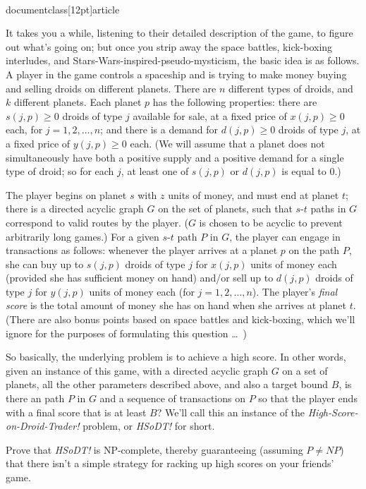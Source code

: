 \\documentclass[12pt]{article}
\begin{document}
\begin{enumerate}
It takes you a while, listening to their detailed description
of the game, to figure out what's going on;
but once you strip away the space battles, kick-boxing interludes,
and Stars-Wars-inspired-pseudo-mysticism,
the basic idea is as follows.
A player in the game controls a spaceship and
is trying to make money buying and selling droids on different planets.
There are $n$ different types of droids,
and $k$ different planets.
Each planet $p$ has the following properties:
there are $s(j,p) \geq 0$ droids of type $j$ available for sale,
at a fixed price of $x(j,p) \geq 0$ each, for $j = 1, 2, \ldots, n$;
and there is a demand for $d(j,p) \geq 0$ droids of type $j$,
at a fixed price of $y(j,p) \geq 0$ each.
(We will assume that a planet does not simultaneously
have both a positive supply and a positive demand for a single type of droid;
so for each $j$, at least one of $s(j,p)$ or $d(j,p)$ is equal to $0$.)

The player begins on planet $s$ with $z$ units of money,
and must end at planet $t$;
there is a directed acyclic graph $G$ on the set of planets,
such that $s$-$t$ paths in $G$ correspond to
valid routes by the player.
($G$ is chosen to be acyclic to prevent arbitrarily long games.)
For a given $s$-$t$ path $P$ in $G$, the player can engage
in transactions as follows:
whenever the player arrives at a planet $p$ on the path $P$,
she can buy up to $s(j,p)$ droids of type $j$ for $x(j,p)$ units of money each
(provided she has sufficient money on hand)
and/or sell up to $d(j,p)$ droids of type $j$ for $y(j,p)$ units of money each
(for $j = 1, 2, \ldots, n$).
The player's {\em final score} is the total amount of
money she has on hand when she arrives at planet $t$.
(There are also bonus points based on space battles and kick-boxing,
which we'll ignore for the purposes of formulating this question \ldots\ )

So basically, the underlying problem is to achieve a high score.
In other words, given an instance of this game,
with a directed acyclic graph $G$ on a set of planets,
all the other parameters described above,
and also a target bound $B$,
is there an path $P$ in $G$ and a sequence of transactions
on $P$ so that the player ends with a final score
that is at least $B$?
We'll call this an instance of the
{\em High-Score-on-Droid-Trader!} problem,
or {\em HSoDT!} for short.

Prove that {\em HSoDT!} is NP-complete, thereby
guaranteeing (assuming $P \neq NP$) that there isn't
a simple strategy for racking up high scores on your friends' game.


\end{enumerate}
\end{document}
